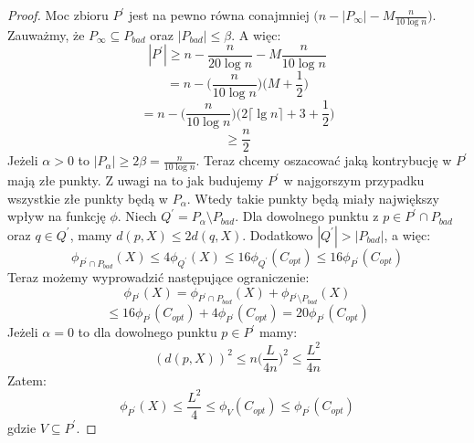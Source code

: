\begin{proof}
    Moc zbioru $P^{'}$ jest na pewno równa conajmniej $\Big(n - |P_{\infty}| - M\frac{n}{10 \log n} \Big)$.
    Zauważmy, że $P_{\infty} \subseteq P_{bad}$ oraz $|P_{bad}| \leq \beta$.
    A więc:
    \begin{equation}
        |P^{'}| \geq n - \frac{n}{20 \log n} - M \frac{n}{10 \log n}
    \end{equation}
    \begin{equation}
        = n - \Big(\frac{n}{10 \log n}\Big) \Big(M + \frac{1}{2}\Big)
    \end{equation}
    \begin{equation}
        = n - \Big(\frac{n}{10 \log n}\Big) \Big(2 \lceil \lg n \rceil + 3 + \frac{1}{2}\Big)
    \end{equation}
    \begin{equation}
        \geq \frac{n}{2}
    \end{equation}
    Jeżeli $\alpha > 0$ to $|P_{\alpha}| \geq 2\beta = \frac{n}{10 \log n}$.
    Teraz chcemy oszacować jaką kontrybucję w $P^{'}$ mają złe punkty.
    Z uwagi na to jak budujemy $P^{'}$ w najgorszym przypadku wszystkie złe punkty będą w $P_{\alpha}$.
    Wtedy takie punkty będą miały największy wpływ na funkcję $\phi$.
    Niech $Q^{'} = P_{\alpha} \setminus P_{bad}$.
    Dla dowolnego punktu z $p \in P^{'} \cap P_{bad}$ oraz $q \in Q^{'}$, mamy $d(p, X) \leq 2d(q,X)$.
    Dodatkowo $|Q^{'}| > |P_{bad}|$, a więc:
    \begin{equation}
        \phi_{P^{'} \cap P_{bad}}(X) \leq 4\phi_{Q^{'}}(X) \leq 16\phi_{Q^{'}}(C_{opt}) \leq 16\phi_{P^{'}}(C_{opt})
    \end{equation}
    Teraz możemy wyprowadzić następujące ograniczenie:
    \begin{equation}
        \phi_{P^{'}}(X) = \phi_{P^{'} \cap P_{bad}}(X) + \phi_{P^{'} \setminus P_{bad}}(X)
    \end{equation}
    \begin{equation}
        \leq 16\phi_{P^{'}}(C_{opt}) + 4\phi_{P^{'}}(C_{opt}) = 20\phi_{P^{'}}(C_{opt})
    \end{equation}
    Jeżeli $\alpha = 0$ to dla dowolnego punktu $p \in P^{'}$ mamy:
    \begin{equation}
        (d(p,X))^2 \leq n\Big(\frac{L}{4n}\Big)^2 \leq \frac{L^{2}}{4n}
    \end{equation}
    Zatem:
    \begin{equation}
        \phi_{P^{'}}(X) \leq \frac{L^{2}}{4} \leq \phi_{V}(C_{opt}) \leq \phi_{P^{'}}(C_{opt})
    \end{equation}
    gdzie $V \subseteq P^{'}$.
\end{proof}

